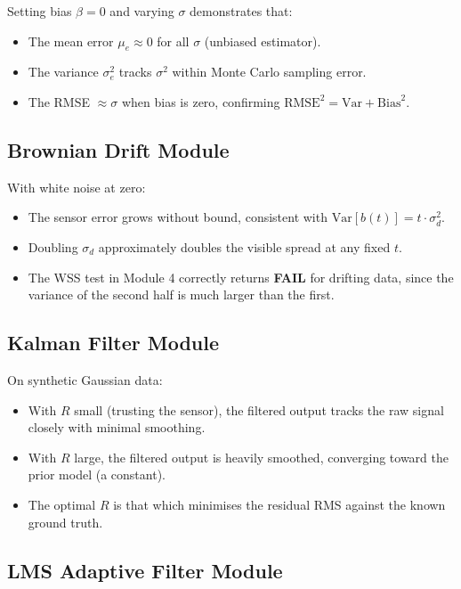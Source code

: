 \documentclass[12pt, a4paper]{article}
\begin{document}
Setting bias $\beta = 0$ and varying $\sigma$ demonstrates that:
\begin{itemize}
  \item The mean error $\mu_e \approx 0$ for all $\sigma$ (unbiased estimator).
  \item The variance $\sigma_e^2$ tracks $\sigma^2$ within Monte Carlo sampling error.
  \item The RMSE $\approx \sigma$ when bias is zero, confirming $\text{RMSE}^2 = \text{Var} + \text{Bias}^2$.
\end{itemize}

\subsection{Brownian Drift Module}

With white noise at zero:
\begin{itemize}
  \item The sensor error grows without bound, consistent with
        $\text{Var}[b(t)] = t \cdot \sigma_d^2$.
  \item Doubling $\sigma_d$ approximately doubles the visible spread at any fixed $t$.
  \item The WSS test in Module 4 correctly returns \textbf{FAIL} for drifting data,
        since the variance of the second half is much larger than the first.
\end{itemize}

\subsection{Kalman Filter Module}

On synthetic Gaussian data:
\begin{itemize}
  \item With $R$ small (trusting the sensor), the filtered output tracks the raw
        signal closely with minimal smoothing.
  \item With $R$ large, the filtered output is heavily smoothed, converging toward the
        prior model (a constant).
  \item The optimal $R$ is that which minimises the residual RMS against the known
        ground truth.
\end{itemize}

\subsection{LMS Adaptive Filter Module}
\end{document}
